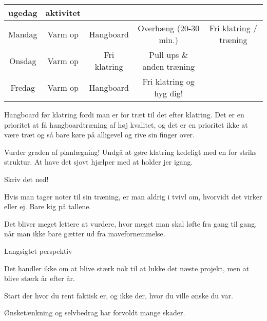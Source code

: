 
\begin{table}[h!]
  \centering
  \begin{tabular}{c| c c c c}
    \textbf{ugedag} & \textbf{aktivitet} & \\ \hline
    Mandag & Varm op & Hangboard & Overh\ae ng (20-30 min.) & Fri klatring / tr\ae ning \\
    Onsdag & Varm op & Fri klatring & Pull ups \& anden tr\ae ning & \\
    Fredag & Varm op & Hangboard & Fri klatring og hyg dig! & \\
  \end{tabular}
\end{table}
  \vspace{1em}
 
Hangboard før klatring fordi man er for træt til det efter klatring. Det er en prioritet at få hangboardtræning af høj kvalitet, og det er en prioritet ikke at være træt og så bare køre på alligevel og rive sin finger over.

Vurder graden af planl\ae gning! Undg{\aa} at gøre klatring kedeligt med en for striks struktur.
At have det sjovt hj\ae lper med at holder jer igang.
\vspace{2em}


\begin{multicols}{2}


  \begin{tList}{Skriv det ned!}
  \item Hvis man tager noter til sin træning, er man aldrig i tvivl
    om, hvorvidt det virker eller ej. Bare kig på tallene.
  \item Det bliver meget lettere at vurdere, hvor meget man skal
    løfte fra gang til gang, når man ikke bare gætter ud fra mavefornemmelse.
  \end{tList}

  \begin{tList}{Langsigtet perspektiv}
  \item Det handler ikke om at blive stærk nok til at lukke det næste
    projekt, men at blive stærk år efter år.
  \item Start der hvor du rent faktisk er, og ikke der, hvor du ville
    ønske du var.

  \item Ønsketænkning og selvbedrag har forvoldt mange skader.
  \end{tList}




\end{multicols}

